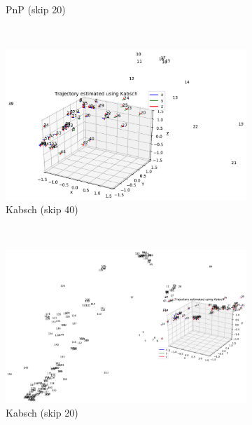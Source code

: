 \documentclass[12pt,a4paper]{article}
\begin{document}
\begin{figure}[p]
\begin{subfigure}[t]{0.3\textwidth}
        \caption{PnP (skip 20)}
        \label{f: lawn pnp}
      \end{subfigure}
      \\
      \begin{subfigure}[t]{0.3\textwidth}
        \includegraphics[width=\textwidth]{../quad/basic-reg-saves-new-circle/40/atrj_d.pdf}
        \caption{Kabsch (skip 40)}
      \end{subfigure} %
      ~
      \begin{subfigure}[t]{0.3\textwidth}
        \includegraphics[width=\textwidth]{../quad/basic-reg-saves-new-rectangle-2/20/atrj_d.pdf}
        \caption{Kabsch (skip 20)}
      \end{subfigure} %
      ~
      \begin{subfigure}[t]{0.3\textwidth}

\end{subfigure}
\end{figure}
\end{document}
